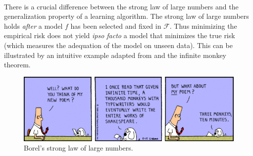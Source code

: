 \paragraph{}
There is a crucial difference between the strong law of large numbers and the
generalization property of a learning algorithm. The strong law of large
numbers holds \emph{after} a model $f$ has been selected and fixed in
$\mathcal{F}$.  Thus minimizing the empirical risk does not yield \emph{ipso
facto} a model that minimizes the true risk (which measures the adequation of
the model on unseen data). This can be illustrated by an intuitive example
adapted from \citet[page 64]{cornuejols2011apprentissage} and the infinite
monkey theorem.
\begin{figure}
    \centering\includegraphics[width=\textwidth]{./gfx/infinite_monkey.jpg}
    \caption{Borel's strong law of large numbers.}
\end{figure}
